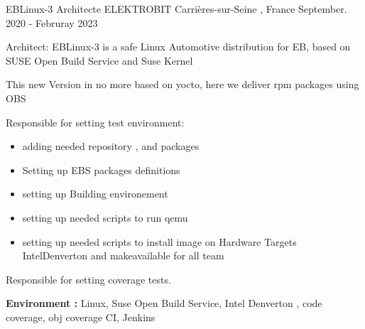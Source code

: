 \documentclass[11pt, a4paper]{awesome-cv} %
\begin{document}
\begin{cventries}
    \cventry
    {EBLinux-3 Architecte} %
    {ELEKTROBIT} %
    {Carrières-sur-Seine , France} %
    {September. 2020 - Februray 2023} %
    { %
        \begin{cvitems}
            \item {Architect: EBLinux-3 is a safe Linux Automotive distribution for EB, based on SUSE Open Build Service and Suse Kernel}
            \item {This new Version in no more based on yocto, here we deliver rpm packages using OBS}
            \item {Responsible for setting test environment:}
            \begin{itemize}
                \item adding needed repository , and packages 
                \item Setting up EBS packages definitions   
                \item setting up Building environement 
                \item setting up needed scripts to run qemu 
                \item setting up needed scripts to install image  on Hardware Targets IntelDenverton and makeavailable for all team
              \end{itemize}
            \item {Responsible for setting coverage tests.}
            \item { \textbf{Environment :} Linux, Suse Open Build Service, Intel Denverton , code coverage, obj coverage CI, Jenkins}
        \end{cvitems}
    }


\end{cventries}
\end{document}
